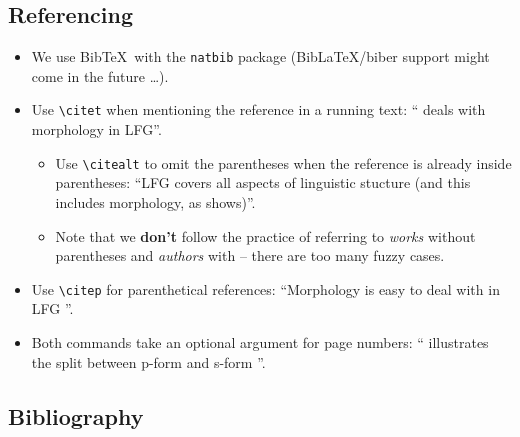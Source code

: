 \documentclass[linguex]{lfg-proc}
\begin{document}
\subsection{Referencing}

\begin{itemize}
  \item We use Bib\TeX\ with the \verb=natbib= package (Bib\LaTeX/biber support
        might come in the future \dots).
  \item Use \verb=\citet= when mentioning the reference in a running text:
        ``\citet{Dalrymple2015} deals with morphology in LFG''.
        \begin{itemize}
          \item Use \verb=\citealt= to omit the parentheses when the reference
                is already inside parentheses: ``LFG covers all aspects of
                linguistic stucture (and this includes morphology, as
                \citealt{Dalrymple2015} shows)''.
          \item Note that we \textbf{don't} follow the practice of referring to
                \emph{works} without parentheses and \emph{authors} with --
                there are too many fuzzy cases.
        \end{itemize}
  \item Use \verb=\citep= for parenthetical references: ``Morphology is easy to
        deal with in LFG \citep{Dalrymple2015}''.
  \item Both commands take an optional argument for page numbers:
        ``\citet[66]{Dalrymple2015} illustrates the split between p-form and
        s-form \citep[177]{dalrymple-mycock:prosody}''.
\end{itemize}

\subsection{Bibliography}
\end{document}
